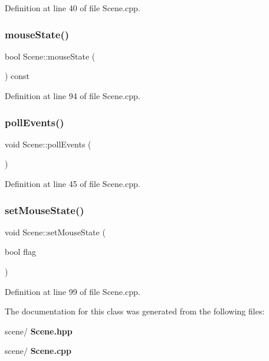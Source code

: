 Definition at line 40 of file Scene.\+cpp.

\mbox{\label{class_scene_a2ce3780f0b8caef89e72a2b8fbde3a33}} 
\subsubsection{mouse\+State()}
{\footnotesize\ttfamily bool Scene\+::mouse\+State (\begin{DoxyParamCaption}{ }\end{DoxyParamCaption}) const}



Definition at line 94 of file Scene.\+cpp.

\mbox{\label{class_scene_a41ccb2e0cc9a19faa18ec22a21c06372}} 
\subsubsection{poll\+Events()}
{\footnotesize\ttfamily void Scene\+::poll\+Events (\begin{DoxyParamCaption}{ }\end{DoxyParamCaption})}



Definition at line 45 of file Scene.\+cpp.

\mbox{\label{class_scene_a169950f4ad086061546e2ce23d799487}} 
\subsubsection{set\+Mouse\+State()}
{\footnotesize\ttfamily void Scene\+::set\+Mouse\+State (\begin{DoxyParamCaption}\item[{bool}]{flag }\end{DoxyParamCaption})}



Definition at line 99 of file Scene.\+cpp.



The documentation for this class was generated from the following files\+:\begin{DoxyCompactItemize}
\item 
scene/\textbf{ Scene.\+hpp}\item 
scene/\textbf{ Scene.\+cpp}\end{DoxyCompactItemize}
